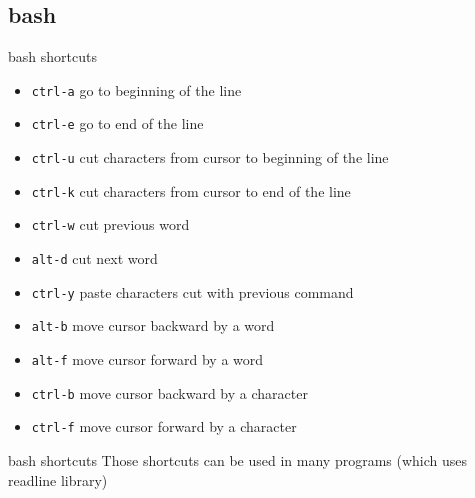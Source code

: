 \subsection{bash}

\begin{frame}[fragile]{bash shortcuts}
  \begin{itemize}
    \pause \item \texttt{ctrl-a} go to beginning of the line
    \pause \item \texttt{ctrl-e} go to end of the line
    \pause \item \texttt{ctrl-u} cut characters from cursor to beginning of the line
    \pause \item \texttt{ctrl-k} cut characters from cursor to end of the line
    \pause \item \texttt{ctrl-w} cut previous word
    \pause \item \texttt{alt-d} cut next word
    \pause \item \texttt{ctrl-y} paste characters cut with previous command
    \pause \item \texttt{alt-b} move cursor backward by a word
    \pause \item \texttt{alt-f} move cursor forward by a word
    \pause \item \texttt{ctrl-b} move cursor backward by a character
    \pause \item \texttt{ctrl-f} move cursor forward by a character
  \end{itemize}
\pause
\end{frame}

\begin{frame}[fragile]{bash shortcuts}
Those shortcuts can be used in many programs (which uses readline library)
\end{frame}

